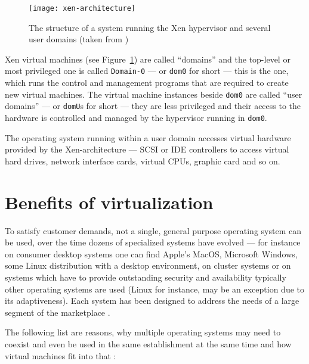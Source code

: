 \begin{figure}[htbp]
  \centering
  \texttt{[image: xen-architecture]}
  \caption[Xen architecture]{The structure of a system running the Xen
    hypervisor and several user domains (taken from \cite{xen-art})}
  \label{fig:xen-architecture}
\end{figure}

Xen  virtual machines  (see Figure~\ref{fig:xen-architecture})  are called
``domains''  and   the  top-level  or   most  privileged  one   is  called
\texttt{Domain-0}  --- or  \texttt{dom0} for  short ---  this is  the one,
which runs the control and management programs that are required to create
new virtual machines.  The  virtual machine instances beside \texttt{dom0}
are called ``user  domains'' --- or \texttt{domU}s for  short --- they are
less privileged and their access to the hardware is controlled and managed
by the hypervisor running in \texttt{dom0}.

The  operating  system  running  within  a user  domain  accesses  virtual
hardware provided by  the Xen-architecture --- SCSI or  IDE controllers to
access virtual hard drives, network interface cards, virtual CPUs, graphic
card and so on.


\section{Benefits of virtualization}
\label{sec:benefits}

To  satisfy customer  demands,  not a  single,  general purpose  operating
system  can be  used, over  the time  dozens of  specialized  systems have
evolved --- for instance on  consumer desktop systems one can find Apple's
MacOS,  Microsoft   Windows,  some  Linux  distribution   with  a  desktop
environment,  on cluster  systems  or  on systems  which  have to  provide
outstanding  security and availability  typically other  operating systems
are  used   (Linux  for  instance,  may   be  an  exception   due  to  its
adaptiveness).  Each  system has been designed  to address the  needs of a
large segment of the marketplace \cite{borden89}.

\bigskip

The following list are reasons, why multiple operating systems may need to
coexist and  even be used in the  same establishment at the  same time and
how virtual machines fit into that \cite{borden89,virtualization-overview}:

